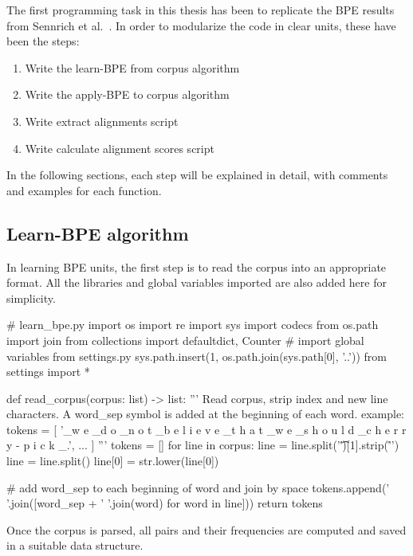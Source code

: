 The first programming task in this thesis has been to replicate the BPE results from Sennrich et al.~\cite{sennrich2015neural}. In order to modularize the code in clear units, these have been the steps:

\begin{enumerate}
    \item Write the learn-BPE from corpus algorithm
    \item Write the apply-BPE to corpus algorithm
    \item Write extract alignments script
    \item Write calculate alignment scores script
\end{enumerate}

In the following sections, each step will be explained in detail, with comments and examples for each function.

\subsection{Learn-BPE algorithm}\label{subsec:learnbpe}

In learning BPE units, the first step is to read the corpus into an appropriate format. All the libraries and global variables imported are also added here for simplicity.

\begin{python}
# learn_bpe.py
import os
import re
import sys
import codecs
from os.path import join
from collections import defaultdict, Counter
# import global variables from settings.py
sys.path.insert(1, os.path.join(sys.path[0], '..'))
from settings import *

def read_corpus(corpus: list) -> list:
  '''
  Read corpus, strip index and new line characters.
  A word_sep symbol is added at the beginning of each word.
  example:
  tokens = [
    '\_w e \_d o \_n o t \_b e l i e v e 
    \_t h a t \_w e \_s h o u l d 
    \_c h e r r y - p i c k \_.',
    ...
]
  '''
  tokens = []
  for line in corpus:
    line = line.split('\t')[1].strip('\r\n ')
    line = line.split()
    line[0] = str.lower(line[0])

    # add word_sep to each beginning of word and join by space
    tokens.append(' '.join([word_sep + ' '.join(word) for word in line]))
  return tokens
\end{python}

Once the corpus is parsed, all pairs and their frequencies are computed and saved in a suitable data structure.

